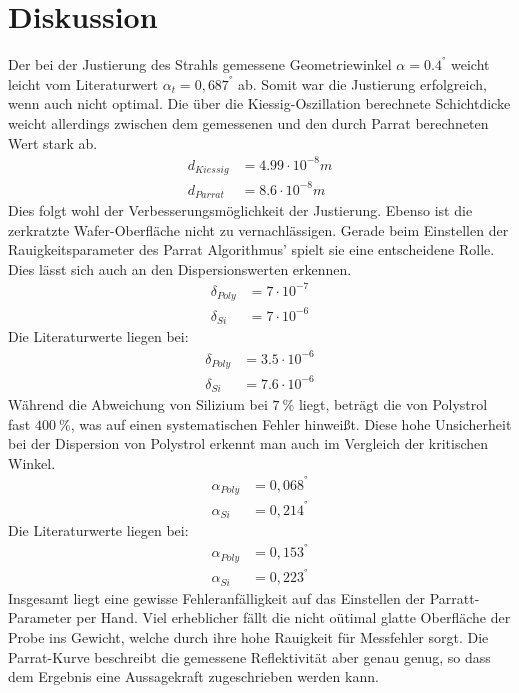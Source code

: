 \section{Diskussion}
\label{sec:Diskussion}

Der bei der Justierung des Strahls gemessene Geometriewinkel $\alpha = 0.4^°$ weicht leicht vom Literaturwert $\alpha_{t} = 0,687^°$ ab.
Somit war die Justierung erfolgreich, wenn auch nicht optimal.
Die über die Kiessig-Oszillation berechnete Schichtdicke weicht allerdings zwischen dem gemessenen 
und den durch Parrat berechneten Wert stark ab.
\begin{align*}
    d_{Kiessig} &= 4.99 \cdot 10^{-8} m \\
    d_{Parrat} &= 8.6 \cdot 10^{-8} m
\end{align*}
Dies folgt wohl der Verbesserungsmöglichkeit der Justierung.
Ebenso ist die zerkratzte Wafer-Oberfläche nicht zu vernachlässigen.
Gerade beim Einstellen der Rauigkeitsparameter des Parrat Algorithmus' spielt sie eine entscheidene Rolle.
Dies lässt sich auch an den Dispersionswerten erkennen.
\begin{align*}
    \delta_{Poly} &= 7 \cdot 10^{-7}  \\
    \delta_{Si} &= 7 \cdot 10^{-6} 
\end{align*}
Die Literaturwerte \cite{wert} liegen bei:
\begin{align*}
    \delta_{Poly} &= 3.5 \cdot 10^{-6}  \\
    \delta_{Si} &= 7.6 \cdot 10^{-6} 
\end{align*}
Während die Abweichung von Silizium bei $\qty{7}{\percent}$ liegt, beträgt die von Polystrol fast $\qty{400}{\percent}$,
was auf einen systematischen Fehler hinweißt.
Diese hohe Unsicherheit bei der Dispersion von Polystrol erkennt man auch im Vergleich der kritischen Winkel.
\begin{align*}
    \alpha_{Poly} &= 0,068^°  \\
    \alpha_{Si} &= 0,214^°
\end{align*}
Die Literaturwerte \cite{wert} liegen bei:
\begin{align*}
    \alpha_{Poly} &= 0,153^°  \\
    \alpha_{Si} &= 0,223^°
\end{align*}
Insgesamt liegt eine gewisse Fehleranfälligkeit auf das Einstellen der Parratt-Parameter per Hand.
Viel erheblicher fällt die nicht oütimal glatte Oberfläche der Probe ins Gewicht,
welche durch ihre hohe Rauigkeit für Messfehler sorgt. 
Die Parrat-Kurve beschreibt die gemessene Reflektivität aber genau genug, 
so dass dem Ergebnis eine Aussagekraft zugeschrieben werden kann.
